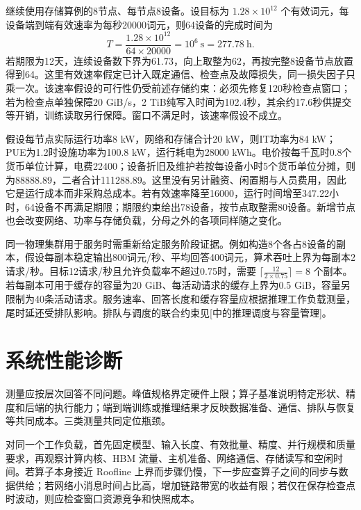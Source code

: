 \documentclass[../textbook.tex]{subfiles}
\begin{document}
\begin{example}
\optional


\label{sec:infra-unified-budget}
继续使用存储算例的8节点、每节点8设备。设目标为 $1.28\times10^{12}$ 个有效词元，每设备端到端有效速率为每秒20000词元，则64设备的完成时间为
\begin{equation*}
 T=\frac{1.28\times10^{12}}{64\times20000}
 =10^6\ \mathrm{s}=277.78\ \mathrm{h}.
\end{equation*}
若期限为12天，连续设备数下界为61.73，向上取整为62，再按完整8设备节点放置得到64。这里有效速率假定已计入既定通信、检查点及故障损失，同一损失因子只乘一次。该速率假设的可行性仍受前述存储约束：必须先修复120秒检查点窗口；若为检查点单独保障20 GiB/s，2 TiB纯写入时间为102.4秒，其余约17.6秒供提交等开销，训练读取另行保障。窗口不满足时，该速率假设不成立。

假设每节点实际运行功率8 kW，网络和存储合计20 kW，则IT功率为84 kW；PUE为1.2时设施功率为100.8 kW，运行耗电为28000 kWh。电价按每千瓦时0.8个货币单位计算，电费22400；设备折旧及维护若按每设备小时5个货币单位分摊，则为88888.89，二者合计111288.89。这里没有另计融资、闲置期与人员费用，因此它是运行成本而非采购总成本。若有效速率降至16000，运行时间增至347.22小时，64设备不再满足期限；期限约束给出78设备，按节点取整需80设备。新增节点也会改变网络、功率与存储负载，分母之外的各项同样随之变化。

同一物理集群用于服务时需重新给定服务阶段证据。例如构造8个各占8设备的副本，假设每副本稳定输出800词元/秒、平均回答400词元，算术吞吐上界为每副本2请求/秒。目标12请求/秒且允许负载率不超过0.75时，需要 $\lceil\frac{12}{2\times0.75}\rceil=8$ 个副本。若每副本可用于缓存的容量为20 GiB、每活动请求的缓存上界为0.5 GiB，容量另限制为40条活动请求。服务速率、回答长度和缓存容量应根据推理工作负载测量，尾时延还受排队影响。排队与调度的联合约束见[中的推理调度与容量管理]。
\end{example}

\section{系统性能诊断}

测量应按层次回答不同问题。峰值规格界定硬件上限；算子基准说明特定形状、精度和后端的执行能力；端到端训练或推理结果才反映数据准备、通信、排队与恢复等共同成本。三类测量共同定位瓶颈。

对同一个工作负载，首先固定模型、输入长度、有效批量、精度、并行规模和质量要求，再观察计算内核、HBM 流量、主机准备、网络通信、存储读写和空闲时间。若算子本身接近 Roofline 上界而步骤仍慢，下一步应查算子之间的同步与数据供给；若网络小消息时间占比高，增加链路带宽的收益有限；若仅在保存检查点时波动，则应检查窗口资源竞争和快照成本。
\end{document}
